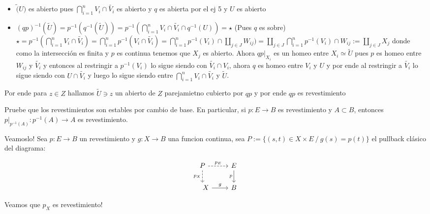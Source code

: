 \documentclass[11pt]{article}
\newenvironment{proof}[1][Demostraci\'on]{\begin{trivlist}
\item[\hskip \labelsep {\bfseries #1}]}{\end{trivlist}}
\newcommand{\qed}{\nobreak \ifvmode \relax \else
      \ifdim\lastskip<1.5em \hskip-\lastskip
      \hskip1.5em plus0em minus0.5em \fi \nobreak
      \vrule height0.75em width0.5em depth0.25em\fi}
\begin{document}
\begin{enumerate}
\begin{proof}
\begin{itemize}
\item $\widetilde(U)$ es abierto pues $\bigcap_{i=1}^{n}{V_i \cap \widetilde{V_i}}$ es abierto y $q$ es abierta por el ej 5 y $U$ es abierto

\item $(qp)^{-1}(\widetilde{U}) = p^{-1}(q^{-1}(\widetilde{U})) = p^{-1}(\bigcap_{i=1}^{n}{V_i \cap \widetilde{V_i}} \cap q^{-1}(U))=\star$ (Pues $q$ es sobre) $\star = p^{-1}(\bigcap_{i=1}^{n}{V_i \cap \widetilde{V_i}}) = \bigcap_{i=1}^{n}{p^{-1}(V_i \cap \widetilde{V_i})} = \bigcap_{i=1}^{n}{p^{-1}(V_i) \cap \coprod_{j \in J}{W_{ij}} )} = \coprod_{j \in J} {\bigcap_{i=1}^{n} {p^{-1}(V_i) \cap W_{ij}}} := \coprod_{j \in J} {X_j}$ donde como la intersecci\'on es finita y $p$ es continua tenemos que $X_j$ es abierto. Ahora $qp|_{X_i}$ es un homeo entre $X_i \simeq \widetilde{U}$ pues $p$ es homeo entre $W_{ij}$ y $\widetilde{V_i}$ y entonces al restringir a $p^{-1}(V_i)$ lo sigue siendo con $\widetilde{V_i} \cap V_i$, ahora $q$ es homeo entre $V_i$ y $U$ y por ende al restringir a $\widetilde{V_i}$ lo sigue siendo con $U \cap \widetilde{V_i}$ y luego lo sigue siendo entre $\bigcap_{i=1}^{n}{V_i \cap \widetilde{V_i}}$ y $\widetilde{U}$.

\end{itemize}

Por ende para $z \in Z$ hallamos $\widetilde{U} \ni z$ un abierto de $Z$ parejamietno cubierto por $qp$ y por ende $qp$ es revestimiento \qed

\end{proof}

\item {Pruebe que los revestimientos son estables por cambio de base. En particular, si $p:E\to B$ es revestimiento y $A\subset B$, entonces $p|_{p^{-1}(A)}:p^{-1}(A)\to A$ es revestimiento.
}

\begin{proof}

Veamoslo! Sea $p: E \rightarrow B$ un revestimiento y $g:X \rightarrow B$ una funcion continua, sea $P:=\{(s,t) \in X \times E \ / \ g(s)=p(t)\}$ el pullback cl\'asico del diagrama:

\[
\begin{tikzcd}
P \arrow[dashed]{r}{p_E} \arrow[swap,dashed]{d}{p_X} & E \arrow[swap]{d}{p} \\ \quad 
X \arrow{r}{g} & B
\end{tikzcd}
\]

Veamos que $p_X$ es revestimiento!

\begin{itemize}


\end{itemize}
\end{proof}
\end{enumerate}
\end{document}
